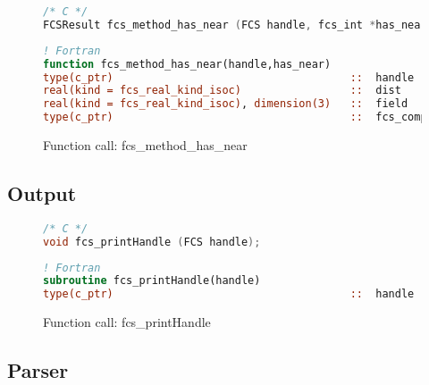 \begin{figure}[htb]
\begin{lstlisting}[language=C,frame=trBL,breaklines,basicstyle=\ttfamily,prebreak={\raisebox{0ex}[0ex][0ex]{\ensuremath{\hookleftarrow}}}]
/* C */
FCSResult fcs_method_has_near (FCS handle, fcs_int *has_near);
\end{lstlisting}
\begin{lstlisting}[language=Fortran,frame=trBL,breaklines,basicstyle=\ttfamily,prebreak={\raisebox{0ex}[0ex][0ex]{\ensuremath{\hookleftarrow}}}]
! Fortran
function fcs_method_has_near(handle,has_near)
type(c_ptr)                                     ::  handle
real(kind = fcs_real_kind_isoc)                 ::  dist
real(kind = fcs_real_kind_isoc), dimension(3)   ::  field
type(c_ptr)                                     ::  fcs_compute_near_field
\end{lstlisting}
\caption{Function call: fcs\_method\_has\_near}
\label{fig:fcs_method_has_near}
\end{figure}


\FloatBarrier
\subsection{Output}

\begin{figure}[htb]
\begin{lstlisting}[language=C,frame=trBL,breaklines,basicstyle=\ttfamily,prebreak={\raisebox{0ex}[0ex][0ex]{\ensuremath{\hookleftarrow}}}]
/* C */
void fcs_printHandle (FCS handle);
\end{lstlisting}
\begin{lstlisting}[language=Fortran,frame=trBL,breaklines,basicstyle=\ttfamily,prebreak={\raisebox{0ex}[0ex][0ex]{\ensuremath{\hookleftarrow}}}]
! Fortran
subroutine fcs_printHandle(handle)
type(c_ptr)                                     ::  handle
\end{lstlisting}
\caption{Function call: fcs\_printHandle}
\label{fig:fcs_printHandle}
\end{figure}


\FloatBarrier
\subsection{Parser}

